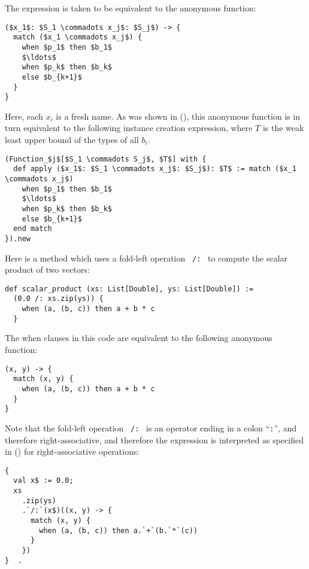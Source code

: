 The expression is taken to be equivalent to the anonymous function:
\begin{lstlisting}
($x_1$: $S_1 \commadots x_j$: $S_j$) -> {
  match ($x_1 \commadots x_j$) {
    when $p_1$ then $b_1$
    $\ldots$
    when $p_k$ then $b_k$
    else $b_{k+1}$
  }
}
\end{lstlisting}

Here, each $x_i$ is a fresh name. As was shown in (), this anonymous function is in turn equivalent to the following instance creation expression, where $T$ is the weak least upper bound of the types of all $b_i$. 

\begin{lstlisting}
(Function_$j$[$S_1 \commadots S_j$, $T$] with {
  def apply ($x_1$: $S_1 \commadots x_j$: $S_j$): $T$ := match ($x_1 \commadots x_j$)
    when $p_1$ then $b_1$
    $\ldots$
    when $p_k$ then $b_k$
    else $b_{k+1}$
  end match
}).new
\end{lstlisting}

\example Here is a method which uses a fold-left operation ~\lstinline!/:!~ to compute the scalar product of two vectors:
\begin{lstlisting}
def scalar_product (xs: List[Double], ys: List[Double]) := 
  (0.0 /: xs.zip(ys)) {
    when (a, (b, c)) then a + b * c
  }
\end{lstlisting}
The when clauses in this code are equivalent to the following anonymous function:
\begin{lstlisting}
(x, y) -> { 
  match (x, y) {
    when (a, (b, c)) then a + b * c
  }
}
\end{lstlisting}
Note that the fold-left operation ~\lstinline!/:!~ is an operator ending in a colon ``\lstinline!:!'', and therefore right-associative, and therefore the expression is interpreted as specified in () for right-associative operations: 

\begin{minipage}{\linewidth}
\begin{lstlisting}[mathescape=false]
{ 
  val x$ := 0.0; 
  xs
    .zip(ys)
    .`/:`(x$)((x, y) -> {
      match (x, y) {
        when (a, (b, c)) then a.`+`(b.`*`(c))
      }
    })
}  . 
\end{lstlisting}
\end{minipage}










